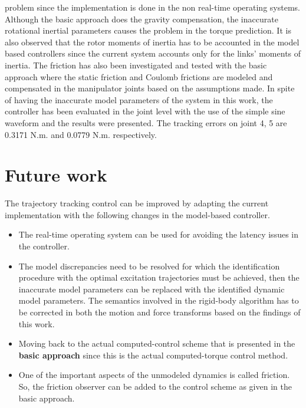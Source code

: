problem since the implementation is done in the non real-time operating systems. Although the basic approach does the gravity compensation, the inaccurate rotational inertial parameters causes the problem in the torque prediction. It is also observed that the rotor moments of inertia has to be accounted in the model based controllers since the current system accounts only for the links' moments of inertia. The friction has also been investigated and tested with the basic approach where the static friction and Coulomb frictions are modeled and compensated in the manipulator joints based on the assumptions made. In spite of having the inaccurate model parameters of the system in this work, the controller has been evaluated in the joint level with the use of the simple sine waveform and the results were presented. The tracking errors on joint 4, 5 are 0.3171 N.m. and 0.0779 N.m. respectively. 

\section*{Future work}

The trajectory tracking control can be improved by adapting the current implementation with the following changes in the model-based controller.

\begin{itemize}
\item The real-time operating system can be used for avoiding the latency issues in the controller.
\item The model discrepancies need to be resolved for which the identification procedure with the optimal excitation trajectories must be achieved, then the inaccurate model parameters can be replaced with the identified dynamic model parameters. The semantics involved in the rigid-body algorithm has to be corrected in both the motion and force transforms based on the findings of this work.
\item Moving back to the actual computed-control scheme that is presented in the \textbf{basic approach} since this is the actual computed-torque control method. 
\item One of the important aspects of the unmodeled dynamics is called friction. So, the friction observer can be added to the control scheme as given in the basic approach.
\end{itemize} 
